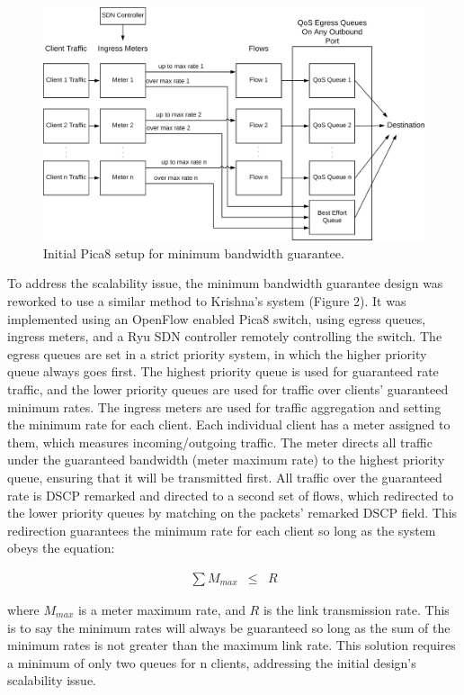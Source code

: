 \documentclass[accepted,single]{gipaper}
\begin{document}
\begin{figure}
	\centering
	\includegraphics[width=6in]{figs/bwGuar_v1.png}
	\caption{ Initial Pica8 setup for minimum bandwidth guarantee. } \label{bwDiag1}
\end{figure}

To address the scalability issue, the minimum bandwidth guarantee design was reworked to use a similar method to Krishna’s \cite{Krishna:2016} system (Figure 2). It was implemented using an OpenFlow enabled Pica8 switch, using egress queues, ingress meters, and a Ryu SDN controller remotely controlling the switch. The egress queues are set in a strict priority system, in which the higher priority queue always goes first. The highest priority queue is used for guaranteed rate traffic, and the lower priority queues are used for traffic over clients’ guaranteed minimum rates. The ingress meters are used for traffic aggregation and setting the minimum rate for each client. Each individual client has a meter assigned to them, which measures incoming/outgoing traffic. The meter directs all traffic under the guaranteed bandwidth (meter maximum rate) to the highest priority queue, ensuring that it will be transmitted first. All traffic over the guaranteed rate is DSCP remarked and directed to a second set of flows, which redirected to the lower priority queues by matching on the packets' remarked DSCP field. This redirection guarantees the minimum rate for each client so long as the system obeys the equation:

\begin{eqnarray*}
	\sum M_{max} &\leq& R
\end{eqnarray*}

where $M_{max}$ is a meter maximum rate, and $R$ is the link transmission rate. This is to say the minimum rates will always be guaranteed so long as the sum of the minimum rates is not greater than the maximum link rate. This solution requires a minimum of only two queues for n clients, addressing the initial design's scalability issue.
\end{document}
